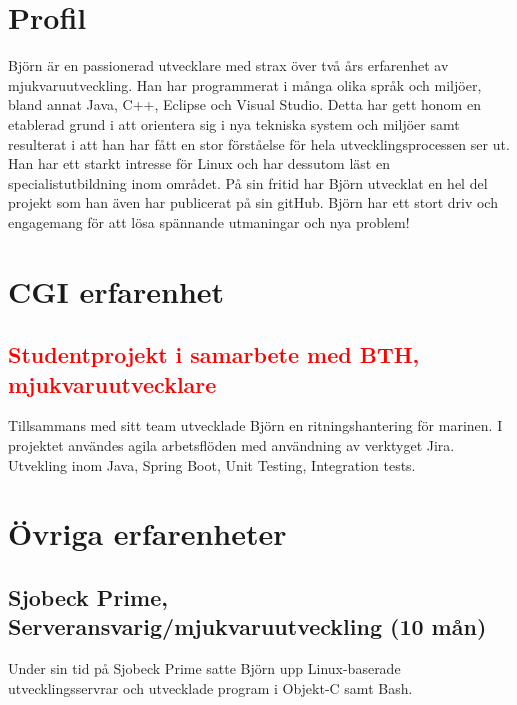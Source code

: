 \documentclass{article}
\begin{document}
\noindent
\begin{minipage}[t]{0.7\textwidth}
\vspace{-20pt} %
\section*{\textcolor{colorBlue}{Profil}}
Björn är en passionerad utvecklare med strax över två års erfarenhet av mjukvaruutveckling. 
Han har programmerat i många olika språk och miljöer, bland annat Java, C++, Eclipse och Visual Studio. Detta har gett honom en etablerad grund i att orientera sig i nya tekniska system och miljöer samt resulterat i att han har fått en stor förståelse för hela utvecklingsprocessen ser ut. 
Han har ett starkt intresse för Linux och har dessutom läst en specialistutbildning inom området. På sin fritid har Björn utvecklat en hel del projekt som han även har publicerat på sin gitHub. 
Björn har ett stort driv och engagemang för att lösa spännande utmaningar och nya problem!

\vspace{30pt} %
\section*{\textcolor{colorBlue}{CGI erfarenhet}}
\subsection*{\textcolor{red}{Studentprojekt i samarbete med BTH, mjukvaruutvecklare }}
Tillsammans med sitt team utvecklade Björn en ritningshantering för marinen. I projektet användes agila arbetsflöden med användning av verktyget Jira. Utvekling inom Java, Spring Boot, Unit Testing, Integration tests.

\vspace{30pt} %
\section*{\textcolor{colorBlue}{Övriga erfarenheter}}
\subsection*{\textcolor{colorRed}{Sjobeck Prime, Serveransvarig/mjukvaruutveckling (10 mån)}}
Under sin tid på Sjobeck Prime satte Björn upp Linux-baserade utvecklingsservrar och utvecklade program i Objekt-C samt Bash. 


\end{minipage}
\end{document}
